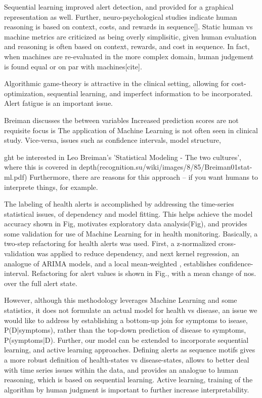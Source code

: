 \documentclass[12pt]{article}
\begin{document}
  Sequential learning improved alert detection, and provided for a graphical representation as well.  Further, neuro-psychological studies indicate human reasoning is based on context, costs, and rewards in sequence[].  Static human vs machine metrics are criticized as being overly simplisitic, given human evaluation and reasoning is often based on context, rewards, and cost in sequence.  In fact, when machines are re-evaluated in the more complex domain, human judgement is found equal or on par with machines[cite].

Algorithmic game-theory is attractive in the clinical setting, allowing for cost-optimization, sequential learning, and imperfect information to be incorporated.
Alert fatigue is an important issue.

Breiman discusses the between variables Increased prediction scores are not requisite focus is The application of Machine Learning is not often seen in clinical study.  Vice-versa, issues such as confidence intervals, model structure,

ght be interested in Leo Breiman's 'Statistical Modeling - The two cultures', where this is covered in depth(recognition.su/wiki/images/8/85/Breiman01stat-ml.pdf) Furthermore, there are reasons for this approach -- if you want humans to interprete things, for example.

The labeling of health alerts is accomplished by addressing the time-series statistical issues, of dependency and model fitting.  This helps achieve the model accuracy shown in Fig, motivates exploratory data analysis(Fig), and provides some validation for use of Machine Learning for in health monitoring.  Basically, a two-step refactoring for health alerts was used.  First, a z-normalized cross-validation was applied to reduce dependency, and next kernel regression, an analogue of ARIMA models, and a local mean-weighted , establishes confidence-interval.  Refactoring for alert values is shown in Fig., with a mean change of nos. over the full alert state.

   However, although this methodology leverages Machine Learning and some statistics, it does not formulate an actual model for health vs disease, an issue we would like to address by establishing a bottom-up join for symptoms to isease, P(D|symptoms), rather than the top-down prediction of disease to symptoms, P(symptoms|D).  Further, our model can be extended to incorporate sequential learning, and active learning approaches.  Defining alerts as sequence motifs gives a more robust definition of health-states vs disease-states, allows to better deal with time series issues within the data, and provides an analogue to human reasoning, which is based on sequential learning.  Active learning, training of the algorithm by human judgment is important to further increase interpretability.
\end{document}
